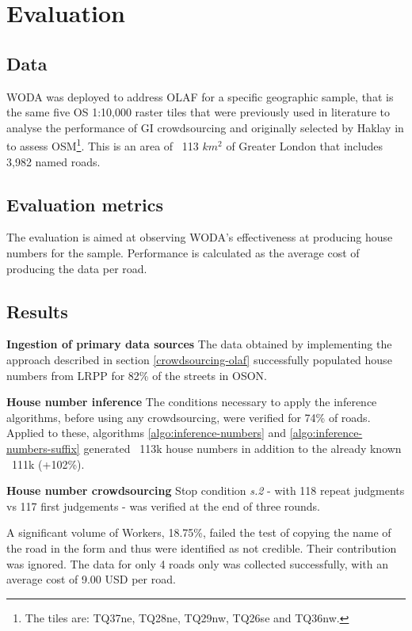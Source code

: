 \section{Evaluation}

\subsection{Data}

WODA was deployed to address OLAF for a specific geographic sample, that is the same five OS 1:10,000 raster tiles that were previously used in literature to analyse the performance of GI crowdsourcing and originally selected by Haklay in \cite{Haklay:2010vs} to assess OSM\footnote{The tiles are: TQ37ne, TQ28ne, TQ29nw, TQ26se and TQ36nw.}. This is an area of ~113 $ km^2 $ of Greater London that includes 3,982 named roads. 

\subsection{Evaluation metrics}

The evaluation is aimed at observing WODA's effectiveness at producing house numbers for the sample. Performance is calculated as the average cost of producing the data per road. 

\subsection{Results}

\textbf{Ingestion of primary data sources} The data obtained by implementing the approach described in section \ref{crowdsourcing-olaf} successfully populated house numbers from LRPP for 82\% of the streets in OSON.

\textbf{House number inference} The conditions necessary to apply the inference algorithms, before using any crowdsourcing, were verified for 74\% of roads. Applied to these, algorithms \ref{algo:inference-numbers} and \ref{algo:inference-numbers-suffix} generated ~113k house numbers in addition to the already known ~111k (+102\%). 

\textbf{House number crowdsourcing} Stop condition {\it s.2} - with 118 repeat judgments vs 117 first judgements - was verified at the end of three rounds. 

A significant volume of Workers, 18.75\%, failed the test of copying the name of the road in the form and thus were identified as not credible. Their contribution was ignored. The data for only 4 roads only was collected successfully, with an average cost of 9.00 USD per road.

